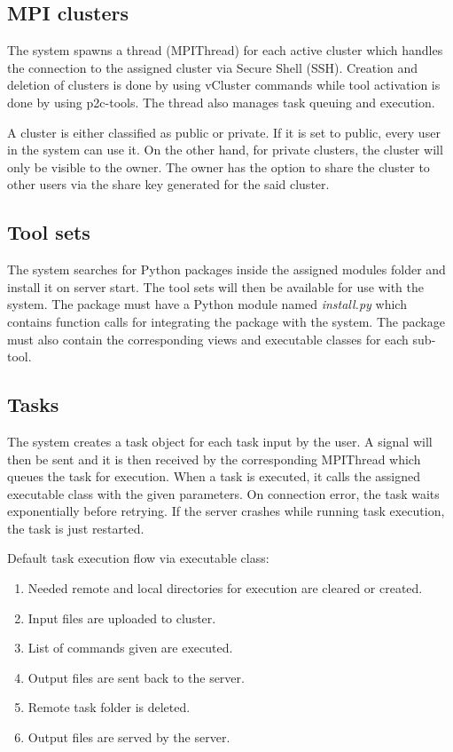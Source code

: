		\subsection{MPI clusters} 
		The system spawns a thread (MPIThread) for each active cluster which handles the connection to the assigned cluster via Secure Shell (SSH). Creation and deletion of clusters is done by using vCluster commands while tool activation is done by using p2c-tools. The thread also manages task queuing and execution.
		
		A cluster is either classified as public or private. If it is set to public, every user in the system can use it. On the other hand, for private clusters, the cluster will only be visible to the owner. The owner has the option to share the cluster to other users via the share key generated for the said cluster. 		

		\subsection{Tool sets} 
		The system searches for Python packages inside the assigned modules folder and install it on server start. The tool sets will then be available for use with the system. The package must have a Python module named \emph{install.py} which contains function calls for integrating the package with the system. The package must also contain the corresponding views and executable classes for each sub-tool.  

		\subsection{Tasks} 
		The system creates a task object for each task input by the user. A signal will then be sent and it is then received by the corresponding MPIThread which queues the task for execution. When a task is executed, it calls the assigned executable class with the given parameters. On connection error, the task waits exponentially before retrying. If the server crashes while running task execution, the task is just restarted.				
		
		 Default task execution flow via executable class:			
		\begin{enumerate}
			\item  Needed remote and local directories for execution are cleared or created.
			\item  Input files are uploaded to cluster.
			\item  List of commands given are executed.
			\item  Output files are sent back to the server.
			\item  Remote task folder is deleted.
			\item  Output files are served by the server.
		\end{enumerate}	

